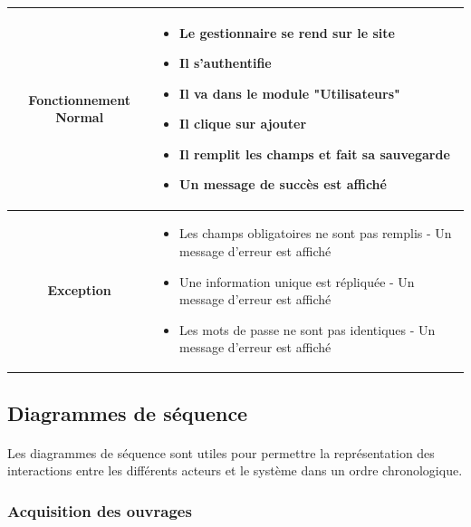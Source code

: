 \par 
\begin{tabular}{|c|p{7cm}|}
        \hline
        \textbf{Fonctionnement Normal} & \begin{itemize}
                \item Le gestionnaire se rend sur le site
                \item Il s'authentifie
                \item Il va dans le module "Utilisateurs"
                \item Il clique sur ajouter
                \item Il remplit les champs et fait sa sauvegarde
                \item Un message de succès est affiché
        \end{itemize} \\
        \hline
        \textbf{Exception} & \begin{itemize}
                \item Les champs obligatoires ne sont pas remplis - Un message d'erreur 
                est affiché
                \item Une information unique est répliquée - Un message d'erreur est affiché
                \item Les mots de passe ne sont pas identiques - Un message d'erreur 
                est affiché
        \end{itemize} \\
        \hline
\end{tabular}

\subsection{Diagrammes de séquence}
\paragraph{} 
Les diagrammes de séquence sont utiles pour permettre la représentation des interactions 
entre les différents acteurs et le système dans un ordre chronologique.
\subsubsection{Acquisition des ouvrages} 

